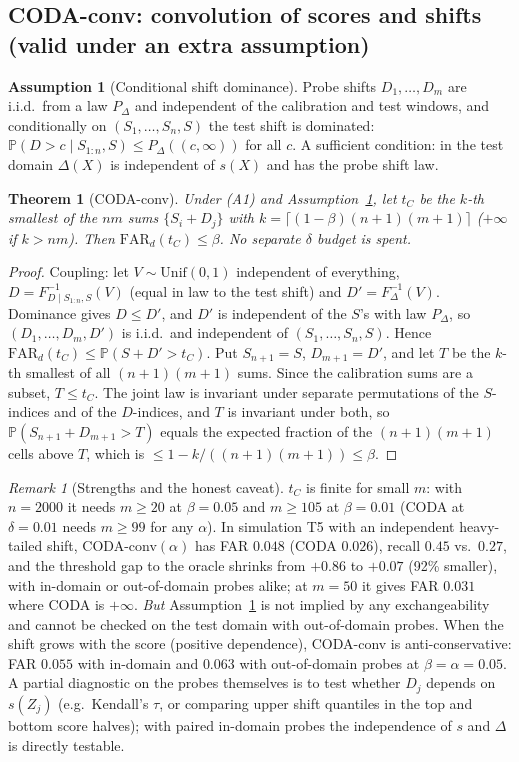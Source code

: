 \documentclass[conference]{IEEEtran}
\newtheorem{theorem}{Theorem}
\theoremstyle{definition}
\newtheorem{assumption}{Assumption}
\theoremstyle{remark}
\newtheorem{remark}{Remark}
\newcommand{\Prob}{\mathbb P}
\newcommand{\FAR}{\mathrm{FAR}}
\begin{document}
\subsection{CODA-conv: convolution of scores and shifts (valid under an extra assumption)}
\begin{assumption}[Conditional shift dominance]\label{ass:cd}
Probe shifts $D_1,\dots,D_m$ are i.i.d.\ from a law $P_\Delta$ and independent of the calibration and test windows, and conditionally on $(S_1,\dots,S_n,S)$ the test shift is dominated: $\Prob(D>c\mid S_{1:n},S)\le P_\Delta((c,\infty))$ for all $c$. A sufficient condition: in the test domain $\Delta(X)$ is independent of $s(X)$ and has the probe shift law.
\end{assumption}
\begin{theorem}[CODA-conv]\label{thm:conv}
Under (A1) and Assumption~\ref{ass:cd}, let $t_C$ be the $k$-th smallest of the $nm$ sums $\{S_i+D_j\}$ with $k=\lceil(1-\beta)(n+1)(m+1)\rceil$ ($+\infty$ if $k>nm$). Then $\FAR_d(t_C)\le\beta$. No separate $\delta$ budget is spent.
\end{theorem}
\begin{proof}
Coupling: let $V\sim\mathrm{Unif}(0,1)$ independent of everything, $D=F^{-1}_{D\mid S_{1:n},S}(V)$ (equal in law to the test shift) and $D'=F_\Delta^{-1}(V)$. Dominance gives $D\le D'$, and $D'$ is independent of the $S$'s with law $P_\Delta$, so $(D_1,\dots,D_m,D')$ is i.i.d.\ and independent of $(S_1,\dots,S_n,S)$. Hence $\FAR_d(t_C)\le\Prob(S+D'>t_C)$. Put $S_{n+1}=S$, $D_{m+1}=D'$, and let $T$ be the $k$-th smallest of all $(n+1)(m+1)$ sums. Since the calibration sums are a subset, $T\le t_C$. The joint law is invariant under separate permutations of the $S$-indices and of the $D$-indices, and $T$ is invariant under both, so $\Prob(S_{n+1}+D_{m+1}>T)$ equals the expected fraction of the $(n+1)(m+1)$ cells above $T$, which is $\le1-k/((n+1)(m+1))\le\beta$.
\end{proof}
\begin{remark}[Strengths and the honest caveat]
$t_C$ is finite for small $m$: with $n=2000$ it needs $m\ge20$ at $\beta=0.05$ and $m\ge105$ at $\beta=0.01$ (CODA at $\delta=0.01$ needs $m\ge99$ for any $\alpha$). In simulation T5 with an independent heavy-tailed shift, CODA-conv$(\alpha)$ has FAR $0.048$ (CODA $0.026$), recall $0.45$ vs.\ $0.27$, and the threshold gap to the oracle shrinks from $+0.86$ to $+0.07$ (92\% smaller), with in-domain or out-of-domain probes alike; at $m=50$ it gives FAR $0.031$ where CODA is $+\infty$. \emph{But} Assumption~\ref{ass:cd} is not implied by any exchangeability and cannot be checked on the test domain with out-of-domain probes. When the shift grows with the score (positive dependence), CODA-conv is anti-conservative: FAR $0.055$ with in-domain and $0.063$ with out-of-domain probes at $\beta=\alpha=0.05$. A partial diagnostic on the probes themselves is to test whether $D_j$ depends on $s(Z_j)$ (e.g.\ Kendall's $\tau$, or comparing upper shift quantiles in the top and bottom score halves); with paired in-domain probes the independence of $s$ and $\Delta$ is directly testable.
\end{remark}
\end{document}
